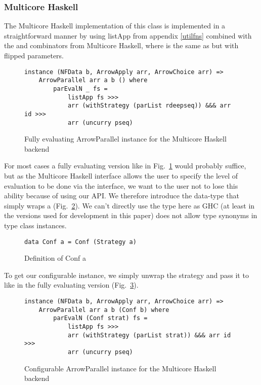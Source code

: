 \subsubsection{Multicore Haskell} \label{sec:parrows:multicore}
The Multicore Haskell implementation of this class is implemented in a straightforward manner by using listApp from appendix \ref{utilfns} combined with the  and  combinators from Multicore Haskell, where  is the same as  but with flipped parameters.
\begin{figure}[h]
\begin{lstlisting}[frame=htrbl]
instance (NFData b, ArrowApply arr, ArrowChoice arr) =>
	ArrowParallel arr a b () where
    	parEvalN _ fs =
       		listApp fs >>>
        	arr (withStrategy (parList rdeepseq)) &&& arr id >>>
        	arr (uncurry pseq)
\end{lstlisting}%
\caption{Fully evaluating ArrowParallel instance for the Multicore Haskell backend}
\label{fig:ArrowParallelMulticoreRdeepseq}
\end{figure}
For most cases a fully evaluating version like in Fig.~\ref{fig:ArrowParallelMulticoreRdeepseq} would probably suffice, but as the Multicore Haskell interface allows the user to specify the level of evaluation to be done via the  interface, we want to the user not to lose this ability because of using our API. We therefore introduce the  data-type that simply wraps a  (Fig.~\ref{fig:confa}). We can't directly use the  type here as GHC (at least in the versions used for development in this paper) does not allow type synonyms in type class instances.
\begin{figure}[h]
\begin{lstlisting}[frame=htrbl]
data Conf a = Conf (Strategy a)
\end{lstlisting}
\caption{Definition of Conf a}
\label{fig:confa}
\end{figure}
To get our configurable  instance, we simply unwrap the strategy and pass it to  like in the fully evaluating version (Fig.~\ref{fig:ArrowParallelMulticoreConfigurable}).
\begin{figure}[h]
\begin{lstlisting}[frame=htrbl]
instance (NFData b, ArrowApply arr, ArrowChoice arr) =>
	ArrowParallel arr a b (Conf b) where
    	parEvalN (Conf strat) fs =
        	listApp fs >>>
        	arr (withStrategy (parList strat)) &&& arr id >>>
        	arr (uncurry pseq)
\end{lstlisting}
\caption{Configurable ArrowParallel instance for the Multicore Haskell backend}
\label{fig:ArrowParallelMulticoreConfigurable}
\end{figure}
